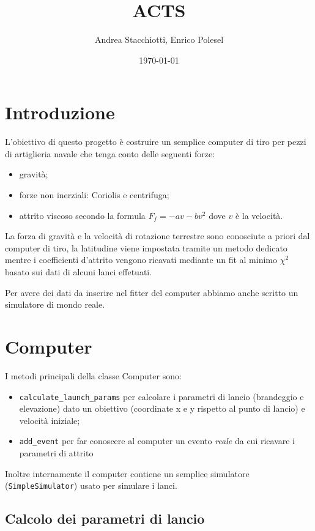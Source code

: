\documentclass[a4paper,10pt]{article}
\title{ACTS}
\author{Andrea Stacchiotti, Enrico Polesel}
\date{\today}
\begin{document}
\maketitle

\section{Introduzione}

L'obiettivo di questo progetto è costruire un semplice computer di
tiro per pezzi di artiglieria navale che tenga conto delle seguenti
forze:
\begin{itemize}
\item gravità;
\item forze non inerziali: Coriolis e centrifuga;
\item attrito viscoso secondo la formula $F_f = -av - bv^2$ dove $v$
  \`e la velocit\`a.
\end{itemize}

La forza di gravit\`a e la velocit\`a di rotazione terrestre sono
conosciute a priori dal computer di tiro, la latitudine viene
impostata tramite un metodo dedicato mentre i coefficienti d'attrito
vengono ricavati mediante un fit al minimo $\chi ^2$ basato sui dati
di alcuni lanci effetuati.

Per avere dei dati da inserire nel fitter del computer abbiamo anche
scritto un simulatore di mondo reale.

\section{Computer}

I metodi principali della classe Computer sono:

\begin{itemize}
\item \verb+calculate_launch_params+ per calcolare i parametri di
  lancio (brandeggio e elevazione) dato un obiettivo (coordinate x e y
  rispetto al punto di lancio) e velocit\`a iniziale;
\item \verb+add_event+ per far conoscere al computer un evento
  \textit{reale} da cui ricavare i parametri di attrito
\end{itemize}

Inoltre internamente il computer contiene un semplice simulatore
(\verb+SimpleSimulator+) usato per simulare i lanci.

\subsection{Calcolo dei parametri di lancio}
\end{document}

